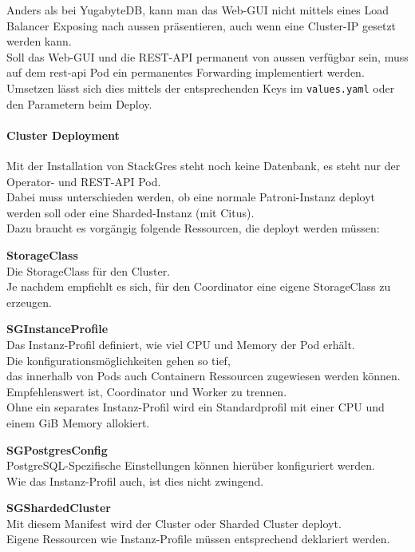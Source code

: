 \begin{flushleft}
    Anders als bei YugabyteDB, kann man das Web-GUI nicht mittels eines Load Balancer Exposing nach aussen präsentieren, auch wenn eine Cluster-IP gesetzt werden kann.\\
    Soll das Web-GUI und die REST-API permanent von aussen verfügbar sein, muss auf dem rest-api Pod ein permanentes Forwarding implementiert werden.\\
    Umsetzen lässt sich dies mittels der entsprechenden Keys im \texttt{values.yaml} oder den Parametern beim Deploy.
\end{flushleft}
\begin{flushleft}
    \paragraph{Cluster Deployment}
    Mit der Installation von StackGres steht noch keine Datenbank, es steht nur der Operator- und REST-API Pod.\\
    Dabei muss unterschieden werden, ob eine normale Patroni-Instanz deployt werden soll oder eine Sharded-Instanz (mit Citus).\\
    Dazu braucht es vorgängig folgende Ressourcen, die deployt werden müssen:\\
    \begin{description}
        \item \textbf{StorageClass}\hfill \\Die StorageClass für den Cluster.\\Je nachdem empfiehlt es sich, für den Coordinator eine eigene StorageClass zu erzeugen.
        \item \textbf{SGInstanceProfile}\hfill \\Das Instanz-Profil definiert, wie viel CPU und Memory der Pod erhält.\\Die konfigurationsmöglichkeiten gehen so tief,\\das innerhalb von Pods auch Containern Ressourcen zugewiesen werden können.\\ Empfehlenswert ist, Coordinator und Worker zu trennen.\\Ohne ein separates Instanz-Profil wird ein Standardprofil mit einer CPU und einem GiB Memory allokiert.
        \item \textbf{SGPostgresConfig}\hfill \\PostgreSQL-Spezifische Einstellungen können hierüber konfiguriert werden.\\Wie das Instanz-Profil auch, ist dies nicht zwingend.
        \item \textbf{SGShardedCluster}\hfill \\Mit diesem Manifest wird der Cluster oder Sharded Cluster deployt.\\Eigene Ressourcen wie Instanz-Profile müssen entsprechend deklariert werden.
    \end{description}
\end{flushleft}
